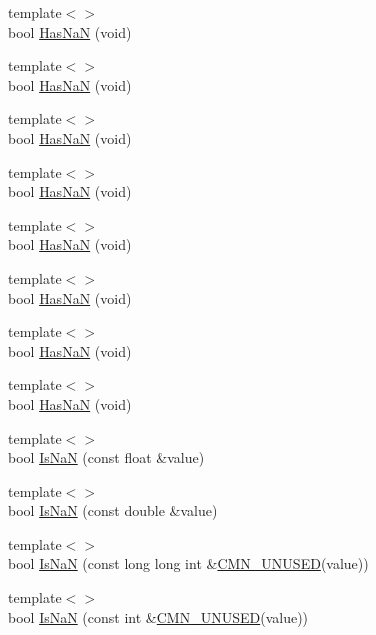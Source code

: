 \begin{DoxyCompactItemize}
\item 
{\footnotesize template$<$$>$ }\\bool \hyperlink{classcmn_type_traits_ae83a3caaf5cfdf887f909dd0d094d110}{Has\-Na\-N} (void)
\item 
{\footnotesize template$<$$>$ }\\bool \hyperlink{classcmn_type_traits_abefe58438a0ed2015063282f396326da}{Has\-Na\-N} (void)
\item 
{\footnotesize template$<$$>$ }\\bool \hyperlink{classcmn_type_traits_a8a4ef34101a2135c9b66a7a8a55dcb9c}{Has\-Na\-N} (void)
\item 
{\footnotesize template$<$$>$ }\\bool \hyperlink{classcmn_type_traits_abc78440efe19a6c8bd8e4317bcf252fe}{Has\-Na\-N} (void)
\item 
{\footnotesize template$<$$>$ }\\bool \hyperlink{classcmn_type_traits_aaa27367df3b6337fe8408ef7337cdb9f}{Has\-Na\-N} (void)
\item 
{\footnotesize template$<$$>$ }\\bool \hyperlink{classcmn_type_traits_adcb9f11f84dd4536779d118af25260fa}{Has\-Na\-N} (void)
\item 
{\footnotesize template$<$$>$ }\\bool \hyperlink{classcmn_type_traits_aef8c78022243e781d47cb400e1d733ef}{Has\-Na\-N} (void)
\item 
{\footnotesize template$<$$>$ }\\bool \hyperlink{classcmn_type_traits_ac58b943f17e99ffe4c03df784cef275c}{Has\-Na\-N} (void)
\item 
{\footnotesize template$<$$>$ }\\bool \hyperlink{classcmn_type_traits_adc22c3d557fe7ace638dbed1d40aadb6}{Is\-Na\-N} (const float \&value)
\item 
{\footnotesize template$<$$>$ }\\bool \hyperlink{classcmn_type_traits_a1ccf42512e0d991e32c996fc97eebd6f}{Is\-Na\-N} (const double \&value)
\item 
{\footnotesize template$<$$>$ }\\bool \hyperlink{classcmn_type_traits_ad2299995afa047f557362f6098235707}{Is\-Na\-N} (const long long int \&\hyperlink{cmn_portability_8h_a021894e2626935fa2305434b1e893ff6}{C\-M\-N\-\_\-\-U\-N\-U\-S\-E\-D}(value))
\item 
{\footnotesize template$<$$>$ }\\bool \hyperlink{classcmn_type_traits_af0aa311738d49efb1aa7ac89256ffaca}{Is\-Na\-N} (const int \&\hyperlink{cmn_portability_8h_a021894e2626935fa2305434b1e893ff6}{C\-M\-N\-\_\-\-U\-N\-U\-S\-E\-D}(value))

\end{DoxyCompactItemize}
